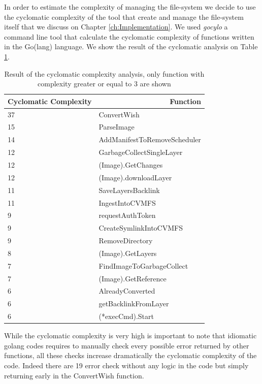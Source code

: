 In order to estimate the complexity of managing the file-system we decide to
use the cyclomatic complexity of the tool that create and manage the
file-system itself that we discuss on Chapter \ref{ch:Implementation}. We used
\textit{gocylo} \cite{gocyclo} a command line tool that calculate the
cyclomatic complexity of functions written in the Go(lang) language. We show
the result of the cyclomatic analysis on Table \ref{tbl:cyclomatic}.

\begin{table}[]
\begin{tabular}{|l|l|}
\hline
\multicolumn{1}{|r|}{Cyclomatic Complexity} & \multicolumn{1}{r|}{Function} \\ \hline
37 & ConvertWish \\ \hline
15 & ParseImage \\ \hline
14 & AddManifestToRemoveScheduler \\ \hline
12 & GarbageCollectSingleLayer \\ \hline
12 & (Image).GetChanges \\ \hline
12 & (Image).downloadLayer \\ \hline
11 & SaveLayersBacklink \\ \hline
11 & IngestIntoCVMFS \\ \hline
9 & requestAuthToken \\ \hline
9 & CreateSymlinkIntoCVMFS \\ \hline
9 & RemoveDirectory \\ \hline
8 & (Image).GetLayers \\ \hline
7 & FindImageToGarbageCollect \\ \hline
7 & (Image).GetReference \\ \hline
6 & AlreadyConverted \\ \hline
6 & getBacklinkFromLayer \\ \hline
6 & (*execCmd).Start \\ \hline
\end{tabular}
\caption{Result of the cyclomatic complexity analysis, only function with complexity greater or equal to 3 are shown}
\label{tbl:cyclomatic}
\end{table}

While the cyclomatic complexity is very high is important to note that
idiomatic golang codes requires to manually check every possible error returned
by other functions, all these checks increase dramatically the cyclomatic
complexity of the code. Indeed there are 19 error check without any logic in
the code but simply returning early in the ConvertWish function.


